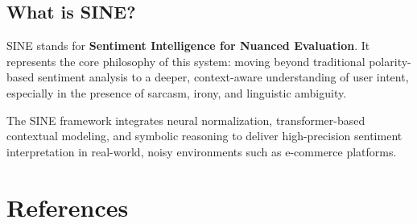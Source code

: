 \documentclass[11pt,oneside]{scrbook}
\begin{document}
\section{What is SINE?}

SINE stands for \textbf{Sentiment Intelligence for Nuanced Evaluation}. It represents the core philosophy of this system: moving beyond traditional polarity-based sentiment analysis to a deeper, context-aware understanding of user intent, especially in the presence of sarcasm, irony, and linguistic ambiguity.

The SINE framework integrates neural normalization, transformer-based contextual modeling, and symbolic reasoning to deliver high-precision sentiment interpretation in real-world, noisy environments such as e-commerce platforms.

\backmatter
\chapter{References}
\end{document}

